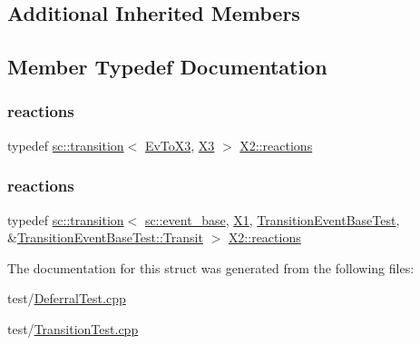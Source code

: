 \subsection*{Additional Inherited Members}


\subsection{Member Typedef Documentation}
\mbox{\label{struct_x2_a25cbaeb930abe68200d4d1d9e4058010}} 
\subsubsection{\texorpdfstring{reactions}{reactions}\hspace{0.1cm}{\footnotesize\ttfamily [1/2]}}
{\footnotesize\ttfamily typedef \mbox{\hyperlink{classboost_1_1statechart_1_1transition}{sc\+::transition}}$<$ \mbox{\hyperlink{struct_ev_to_x3}{Ev\+To\+X3}}, \mbox{\hyperlink{struct_x3}{X3}} $>$ \mbox{\hyperlink{struct_x2_a25cbaeb930abe68200d4d1d9e4058010}{X2\+::reactions}}}

\mbox{\label{struct_x2_a2bce7135945b353eb8e986bebec318ee}} 
\subsubsection{\texorpdfstring{reactions}{reactions}\hspace{0.1cm}{\footnotesize\ttfamily [2/2]}}
{\footnotesize\ttfamily typedef \mbox{\hyperlink{classboost_1_1statechart_1_1transition}{sc\+::transition}}$<$ \mbox{\hyperlink{classboost_1_1statechart_1_1event__base}{sc\+::event\+\_\+base}}, \mbox{\hyperlink{struct_x1}{X1}}, \mbox{\hyperlink{struct_transition_event_base_test}{Transition\+Event\+Base\+Test}}, \&\mbox{\hyperlink{struct_transition_event_base_test_a51e7226f3256cceaf604f958287bcd8b}{Transition\+Event\+Base\+Test\+::\+Transit}} $>$ \mbox{\hyperlink{struct_x2_a25cbaeb930abe68200d4d1d9e4058010}{X2\+::reactions}}}



The documentation for this struct was generated from the following files\+:\begin{DoxyCompactItemize}
\item 
test/\mbox{\hyperlink{_deferral_test_8cpp}{Deferral\+Test.\+cpp}}\item 
test/\mbox{\hyperlink{_transition_test_8cpp}{Transition\+Test.\+cpp}}\end{DoxyCompactItemize}
